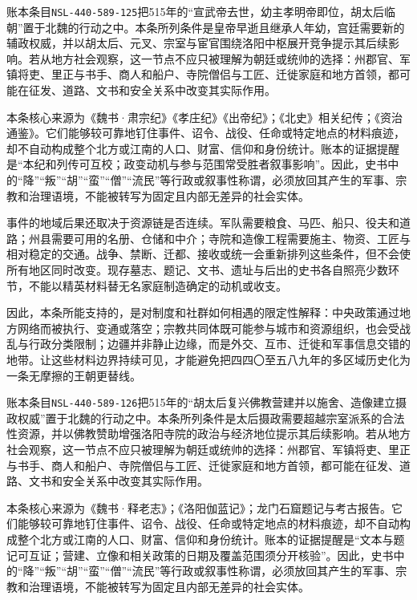 账本条目\texttt{NSL-440-589-125}把515年的“宣武帝去世，幼主孝明帝即位，胡太后临朝”置于北魏的行动之中。本条所列条件是皇帝早逝且继承人年幼，宫廷需要新的辅政权威，并以胡太后、元叉、宗室与宦官围绕洛阳中枢展开竞争提示其后续影响。若从地方社会观察，这一节点不应只被理解为朝廷或统帅的选择：州郡官、军镇将吏、里正与书手、商人和船户、寺院僧侣与工匠、迁徙家庭和地方首领，都可能在征发、道路、文书和安全关系中改变其实际作用。

本条核心来源为《魏书·肃宗纪》《孝庄纪》《出帝纪》；《北史》相关纪传；《资治通鉴》。它们能够较可靠地钉住事件、诏令、战役、任命或特定地点的材料痕迹，却不自动构成整个北方或江南的人口、财富、信仰和身份统计。账本的证据提醒是“本纪和列传可互校；政变动机与参与范围常受胜者叙事影响”。因此，史书中的“降”“叛”“胡”“蛮”“僧”“流民”等行政或叙事性称谓，必须放回其产生的军事、宗教和治理语境，不能被转写为固定且内部无差异的社会实体。

事件的地域后果还取决于资源链是否连续。军队需要粮食、马匹、船只、役夫和道路；州县需要可用的名册、仓储和中介；寺院和造像工程需要施主、物资、工匠与相对稳定的交通。战争、禁断、迁都、接收或统一会重新排列这些条件，但不会使所有地区同时改变。现存墓志、题记、文书、遗址与后出的史书各自照亮少数环节，不能以精英材料替无名家庭制造确定的动机或收支。

因此，本条所能支持的，是对制度和社群如何相遇的限定性解释：中央政策通过地方网络而被执行、变通或落空；宗教共同体既可能参与城市和资源组织，也会受战乱与行政分类限制；边疆并非静止边缘，而是外交、互市、迁徙和军事信息交错的地带。让这些材料边界持续可见，才能避免把四四〇至五八九年的多区域历史化为一条无摩擦的王朝更替线。

账本条目\texttt{NSL-440-589-126}把515年的“胡太后复兴佛教营建并以施舍、造像建立摄政权威”置于北魏的行动之中。本条所列条件是太后摄政需要超越宗室派系的合法性资源，并以佛教赞助增强洛阳寺院的政治与经济地位提示其后续影响。若从地方社会观察，这一节点不应只被理解为朝廷或统帅的选择：州郡官、军镇将吏、里正与书手、商人和船户、寺院僧侣与工匠、迁徙家庭和地方首领，都可能在征发、道路、文书和安全关系中改变其实际作用。

本条核心来源为《魏书·释老志》；《洛阳伽蓝记》；龙门石窟题记与考古报告。它们能够较可靠地钉住事件、诏令、战役、任命或特定地点的材料痕迹，却不自动构成整个北方或江南的人口、财富、信仰和身份统计。账本的证据提醒是“文本与题记可互证；营建、立像和相关政策的日期及覆盖范围须分开核验”。因此，史书中的“降”“叛”“胡”“蛮”“僧”“流民”等行政或叙事性称谓，必须放回其产生的军事、宗教和治理语境，不能被转写为固定且内部无差异的社会实体。


